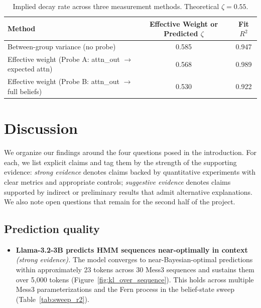 \documentclass[midterm]{sparreport}
\begin{document}
\begin{table}[t]
  \centering
  \caption{Implied decay rate across three measurement methods. Theoretical $\zeta = 0.55$.}
  \label{tab:decay_summary}
  \begin{tabular}{lcc}
    \hline
    Method & Effective Weight or Predicted $\zeta$& Fit $R^2$ \\
    \hline
    Between-group variance (no probe) & 0.585 & 0.947 \\
    Effective weight (Probe A: attn\_out $\to$ expected attn) & 0.568 & 0.989 \\
    Effective weight (Probe B: attn\_out $\to$ full beliefs) & 0.530 & 0.922 \\
    \hline
  \end{tabular}
\end{table}

\section{Discussion}

We organize our findings around the four questions posed in the introduction. For each, we list explicit claims and tag them by the strength of the supporting evidence: \emph{strong evidence} denotes claims backed by quantitative experiments with clear metrics and appropriate controls; \emph{suggestive evidence} denotes claims supported by indirect or preliminary results that admit alternative explanations. We also note open questions that remain for the second half of the project.

\subsection{Prediction quality}

\begin{itemize}
  \item \textbf{Llama-3.2-3B predicts HMM sequences near-optimally in context} \emph{(strong evidence).}
  The model converges to near-Bayesian-optimal predictions within approximately 23 tokens across 30 Mess3 sequences and sustains them over 5{,}000 tokens (Figure~\ref{fig:kl_over_sequence}). This holds across multiple Mess3 parameterizations and the Fern process in the belief-state sweep (Table~\ref{tab:sweep_r2}).
\end{itemize}
\end{document}
